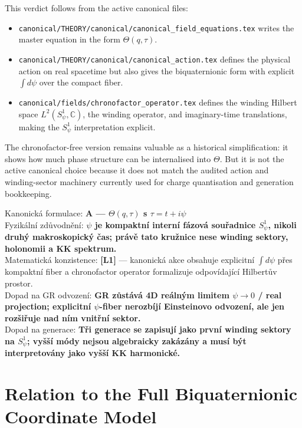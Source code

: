 \documentclass[12pt,a4paper]{article}
\begin{document}
This verdict follows from the active canonical files:
\begin{itemize}
  \item \texttt{canonical/THEORY/canonical/canonical\_field\_equations.tex}
  writes the master equation in the form \(\Theta(q,\tau)\).
  \item \texttt{canonical/THEORY/canonical/canonical\_action.tex} defines the
  physical action on real spacetime but also gives the biquaternionic form with
  explicit \(\int d\psi\) over the compact fiber.
  \item \texttt{canonical/fields/chronofactor\_operator.tex} defines the winding
  Hilbert space \(L^2(S^1_\psi,\mathbb{C})\), the winding operator, and
  imaginary-time translations, making the \(S^1_\psi\) interpretation explicit.
\end{itemize}

The chronofactor-free version remains valuable as a historical simplification:
it shows how much phase structure can be internalised into \(\Theta\).  But it
is not the active canonical choice because it does not match the audited action
and winding-sector machinery currently used for charge quantisation and
generation bookkeeping.

\begin{statusbox}
Kanonická formulace: \textbf{A --- \(\Theta(q,\tau)\) s \(\tau=t+i\psi\)}\\
Fyzikální zdůvodnění: \textbf{\(\psi\) je kompaktní interní fázová souřadnice \(S^1_\psi\), nikoli druhý makroskopický čas; právě tato kružnice nese winding sektory, holonomii a KK spektrum.}\\
Matematická konzistence: \textbf{[L1]} --- kanonická akce obsahuje explicitní \(\int d\psi\) přes kompaktní fiber a chronofactor operator formalizuje odpovídající Hilbertův prostor.\\
Dopad na GR odvození: \textbf{GR zůstává 4D reálným limitem \(\psi\to0\) / real projection; explicitní \(\psi\)-fiber nerozbíjí Einsteinovo odvození, ale jen rozšiřuje nad ním vnitřní sektor.}\\
Dopad na generace: \textbf{Tři generace se zapisují jako první winding sektory na \(S^1_\psi\); vyšší módy nejsou algebraicky zakázány a musí být interpretovány jako vyšší KK harmonické.}
\end{statusbox}

\section{Relation to the Full Biquaternionic Coordinate Model}
\end{document}

